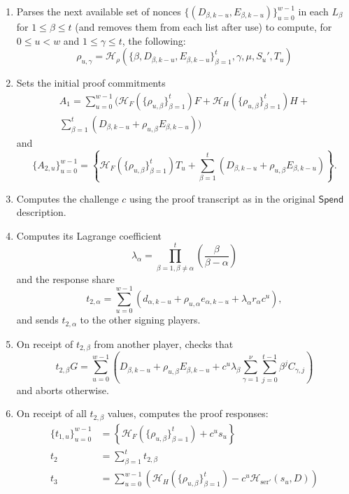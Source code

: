 \documentclass{llncs}
\newcommand{\hash}{\mathcal{H}}
\newcommand{\func}[1]{\mathsf{#1}}
\begin{document}
\begin{enumerate}
    \item Parses the next available set of nonces $\{(D_{\beta,k-u},E_{\beta,k-u})\}_{u=0}^{w-1}$ in each $L_\beta$ for $1 \leq \beta \leq t$ (and removes them from each list after use) to compute, for $0 \leq u < w$ and $1 \leq \gamma \leq t$, the following:
    $$\rho_{u,\gamma} = \hash_{\rho}(\{\beta,D_{\beta,k-u},E_{\beta,k-u}\}_{\beta=1}^{t},\gamma,\mu,S_u',T_u)$$
    \item Sets the initial proof commitments
    \begin{multline*}
        A_1 = \sum_{u=0}^{w-1} \Biggl( \hash_F\left( \{\rho_{u,\beta}\}_{\beta=1}^t \right)F + \hash_H\left( \{\rho_{u,\beta}\}_{\beta=1}^t \right)H + \\
        \sum_{\beta=1}^t \left( D_{\beta,k-u} + \rho_{u,\beta} E_{\beta,k-u} \right) \Biggr)
    \end{multline*}
    and
    \begin{equation*}
        \{A_{2,u}\}_{u=0}^{w-1} = \left\{ \hash_F\left( \{\rho_{u,\beta}\}_{\beta=1}^t \right)T_u + \sum_{\beta=1}^t \left( D_{\beta,k-u} + \rho_{u,\beta} E_{\beta,k-u} \right) \right\}.
    \end{equation*}
    \item Computes the challenge $c$ using the proof transcript as in the original $\func{Spend}$ description.
    \item Computes its Lagrange coefficient $$\lambda_\alpha = \prod_{\beta=1,\beta \neq \alpha}^t \left( \frac{\beta}{\beta-\alpha} \right)$$ and the response share $$t_{2,\alpha} = \sum_{u=0}^{w-1} (d_{\alpha,k-u} + \rho_{u,\alpha} e_{\alpha,k-u} + \lambda_\alpha r_\alpha c^u),$$ and sends $t_{2,\alpha}$ to the other signing players.
    \item On receipt of $t_{2,\beta}$ from another player, checks that $$t_{2,\beta}G = \sum_{u=0}^{w-1} \left( D_{\beta,k-u} + \rho_{u,\beta} E_{\beta,k-u} + c^u\lambda_{\beta} \sum_{\gamma=1}^{\nu}\sum_{j=0}^{t-1} \beta^j C_{\gamma,j} \right)$$ and aborts otherwise.
    \item On receipt of all $t_{2,\beta}$ values, computes the proof responses:
    \begin{align*}
        \{t_{1,u}\}_{u=0}^{w-1} &= \left\{ \hash_F\left( \{\rho_{u,\beta}\}_{\beta=1}^t \right) + c^u s_u \right\} \\
        t_2 &= \sum_{\beta=1}^t t_{2,\beta} \\
        t_3 &= \sum_{u=0}^{w-1} \left( \hash_H\left( \{\rho_{u,\beta}\}_{\beta=1}^t \right) - c^u \hash_{\text{ser}'}(s_u,D) \right)
    \end{align*}
\end{enumerate}
\end{document}
